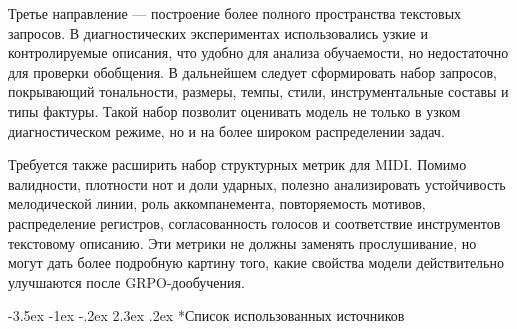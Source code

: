 \documentclass[a4paper,12pt]{extarticle}
\makeatletter
\renewcommand\section{\@startsection{section}{1}{\z@}%
  {-3.5ex \@plus -1ex \@minus -.2ex}%
  {2.3ex \@plus.2ex}%
  {\normalfont\Large\bfseries\Needspace{8\baselineskip}}}
\makeatother
\begin{document}
Третье направление --- построение более полного пространства текстовых
запросов. В диагностических экспериментах использовались узкие и
контролируемые описания, что удобно для анализа обучаемости, но недостаточно
для проверки обобщения. В дальнейшем следует сформировать набор запросов,
покрывающий тональности, размеры, темпы, стили, инструментальные составы и
типы фактуры. Такой набор позволит оценивать модель не только в узком
диагностическом режиме, но и на более широком распределении задач.

Требуется также расширить набор структурных метрик для MIDI. Помимо
валидности, плотности нот и доли ударных, полезно анализировать устойчивость
мелодической линии, роль аккомпанемента, повторяемость мотивов, распределение
регистров, согласованность голосов и соответствие инструментов текстовому
описанию. Эти метрики не должны заменять прослушивание, но могут дать более
подробную картину того, какие свойства модели действительно улучшаются после
GRPO-дообучения.
\clearpage

\section*{Список использованных источников}

\end{document}

